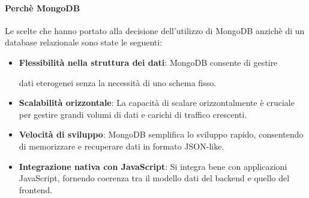 \paragraph{Perchè MongoDB}

Le scelte che hanno portato alla decisione dell'utilizzo di MongoDB anzichè
di un database relazionale sono state le seguenti:

\begin{itemize}
      \item \textbf{Flessibilità nella struttura dei dati}: MongoDB consente di gestire

            dati eterogenei senza la necessità di uno schema fisso.

      \item \textbf{Scalabilità orizzontale}: La capacità di scalare orizzontalmente è
            cruciale per gestire grandi volumi di dati e carichi di traffico crescenti.

      \item \textbf{Velocità di sviluppo}: MongoDB semplifica lo sviluppo rapido,
            consentendo di memorizzare e recuperare dati in formato JSON-like.

      \item \textbf{Integrazione nativa con JavaScript}: Si integra bene con applicazioni
            JavaScript, fornendo coerenza tra il modello dati del backend e quello del frontend.
\end{itemize}








